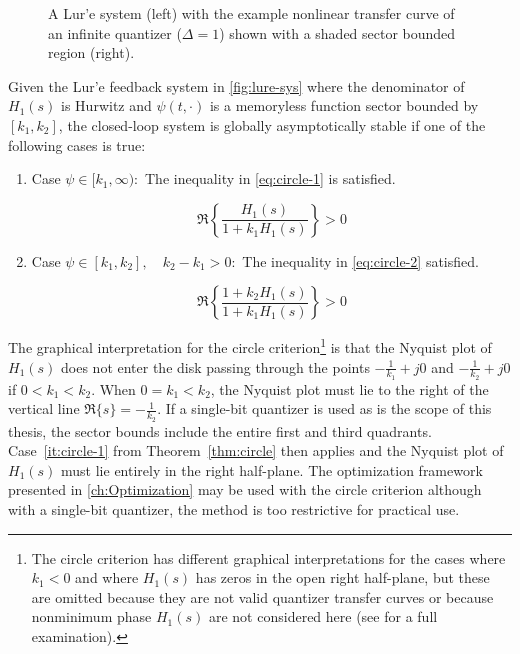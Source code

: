 \begin{figure}
	\caption{A Lur'e system (left) with the example nonlinear transfer curve of an infinite quantizer ($\Delta=1$) shown with a shaded sector bounded region (right).} \label{fig:lure-sys}
\end{figure}

\begin{thm} \label{thm:circle}
	Given the Lur'e feedback system in \autoref{fig:lure-sys} where the denominator of $H_1(s)$ is Hurwitz and $\psi(t, \cdot)$ is a memoryless function sector bounded by $[k_1, k_2]$, the closed-loop system is globally asymptotically stable if one of the following cases is true:
	
	\begin{enumerate}
		\item Case $\psi \in [k_1, \infty):$ The inequality in \autoref{eq:circle-1} is satisfied. \label{it:circle-1}
		
		\begin{equation}
			\Re\left\{\frac{H_1(s)}{1 + k_1H_1(s)}\right\} > 0 \label{eq:circle-1}
		\end{equation}
		
		\item Case $\psi \in [k_1, k_2], \quad k_2 - k_1 > 0:$ The inequality in \autoref{eq:circle-2} satisfied.
		
		\begin{equation}
			\Re\left\{\frac{1 + k_2H_1(s)}{1 + k_1H_1(s)}\right\} > 0 \label{eq:circle-2}
		\end{equation}
	\end{enumerate}
\end{thm}

The graphical interpretation for the circle criterion\footnote{The circle criterion has different graphical interpretations for the cases where $k_1 < 0$ and where $H_1(s)$ has zeros in the open right half-plane, but these are omitted because they are not valid quantizer transfer curves or because nonminimum phase $H_1(s)$ are not considered here (see \cite[Sec. 7.1.1]{Khalil2002} for a full examination).} is that the Nyquist plot of $H_1(s)$ does not enter the disk passing through the points $-\frac{1}{k_1} + j0$ and $-\frac{1}{k_2} + j0$ if $0 < k_1 < k_2$. When $0 = k_1 < k_2$, the Nyquist plot must lie to the right of the vertical line $\Re\{s\} = -\frac{1}{k_2}$. If a single-bit quantizer is used as is the scope of this thesis, the sector bounds include the entire first and third quadrants. Case~\ref{it:circle-1} from Theorem~\ref{thm:circle} then applies and the Nyquist plot of $H_1(s)$ must lie entirely in the right half-plane. The optimization framework presented in \autoref{ch:Optimization} may be used with the circle criterion although with a single-bit quantizer, the method is too restrictive for practical use.

